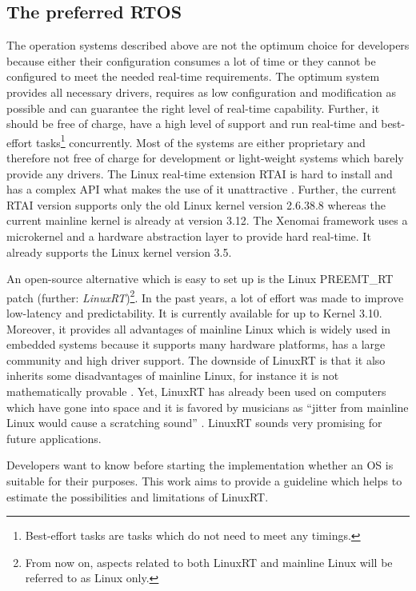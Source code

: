 \subsection{The preferred RTOS}
The operation systems described above are not the optimum choice for developers because either their configuration consumes a lot of time or they cannot be configured to meet the needed real-time requirements.
The optimum system provides all necessary drivers, requires as low configuration and modification as possible and can guarantee the right level of real-time capability. 
Further, it should be free of charge, have a high level of support and run real-time and best-effort tasks\footnote{Best-effort tasks are tasks which do not need to meet any timings.} concurrently.
Most of the systems are either proprietary and therefore not free of charge for development or light-weight systems which barely provide any drivers.
The Linux real-time extension \ac{RTAI} is hard to install and has a complex \ac{API} what makes the use of it unattractive \cite{mitschang:heulfrvr}.
Further, the current \ac{RTAI} version supports only the old Linux kernel version 2.6.38.8 \cite{rtai} whereas the current mainline kernel is already at version 3.12. 
The Xenomai framework uses a microkernel and a hardware abstraction layer to provide hard real-time. 
It already supports the Linux kernel version 3.5.
\par
An open-source alternative which is easy to set up is the Linux PREEMT\_RT patch (further: \textit{LinuxRT})\footnote{From now on, aspects related to both LinuxRT and mainline Linux will be referred to as Linux only.}.
In the past years, a lot of effort was made to improve low-latency and predictability.
It is currently available for up to Kernel 3.10.
Moreover, it provides all advantages of mainline Linux which is widely used in embedded systems because it supports many hardware platforms, has a large community and high driver support.
The downside of LinuxRT is that it also inherits some disadvantages of mainline Linux, for instance it is not mathematically provable \cite{clark:itrtlfed}.
Yet, LinuxRT has already been used on computers which have gone into space and it is favored by musicians as ``jitter from mainline Linux would cause a scratching sound'' \cite{clark:itrtlfed}.
LinuxRT sounds very promising for future applications.
\par
Developers want to know before starting the implementation whether an \ac{OS} is suitable for their purposes.
This work aims to provide a guideline which helps to estimate the possibilities and limitations of LinuxRT. 
